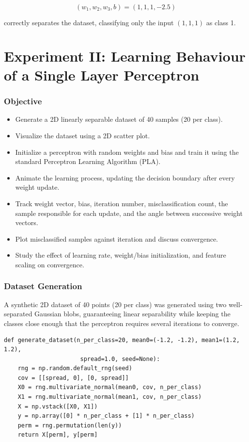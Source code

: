 \documentclass[12pt]{article}
\begin{document}
\[
    (w_1,w_2,w_3,b)=(1,1,1,-2.5)
\]

correctly separates the dataset, classifying only the input $(1,1,1)$ as class 1.

\clearpage
\part*{Experiment II: Learning Behaviour of a Single Layer Perceptron}

\section{Objective}

\begin{itemize}
    \item Generate a 2D linearly separable dataset of 40 samples (20 per class).
    \item Visualize the dataset using a 2D scatter plot.
    \item Initialize a perceptron with random weights and bias and train it using the standard Perceptron Learning Algorithm (PLA).
    \item Animate the learning process, updating the decision boundary after every weight update.
    \item Track weight vector, bias, iteration number, misclassification count, the sample responsible for each update, and the angle between successive weight vectors.
    \item Plot misclassified samples against iteration and discuss convergence.
    \item Study the effect of learning rate, weight/bias initialization, and feature scaling on convergence.
\end{itemize}

\section{Dataset Generation}

A synthetic 2D dataset of 40 points (20 per class) was generated using two well-separated Gaussian blobs, guaranteeing linear separability while keeping the classes close enough that the perceptron requires several iterations to converge.

\begin{lstlisting}[caption=Generating the 2D Linearly Separable Dataset]
def generate_dataset(n_per_class=20, mean0=(-1.2, -1.2), mean1=(1.2, 1.2),
                      spread=1.0, seed=None):
    rng = np.random.default_rng(seed)
    cov = [[spread, 0], [0, spread]]
    X0 = rng.multivariate_normal(mean0, cov, n_per_class)
    X1 = rng.multivariate_normal(mean1, cov, n_per_class)
    X = np.vstack([X0, X1])
    y = np.array([0] * n_per_class + [1] * n_per_class)
    perm = rng.permutation(len(y))
    return X[perm], y[perm]
\end{lstlisting}
\end{document}
